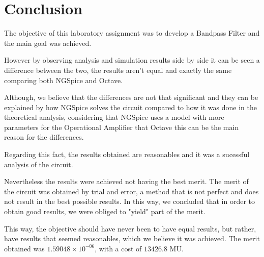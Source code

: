 \newpage
\section{Conclusion}
\label{sec:conclusion}

\hspace{0,5cm} The objective of this laboratory assignment was to develop a Bandpass Filter and the main goal was achieved. 

\par However by observing analysis and simulation results side by side it can be seen a difference between the two, the results aren't equal and exactly the same comparing both NGSpice and Octave. 
\par Although, we believe that the differences are not that significant and they can be explained by how NGSpice solves the circuit compared to how it was done in the theoretical analysis, considering that NGSpice uses a model with more parameters for the Operational Amplifier that Octave this can be the main reason for the differences. 
\par Regarding this fact, the results obtained are reasonables and it was  a sucessful analysis of the circuit.
\par Nevertheless the results were achieved not having the best merit. The merit of the circuit was obtained by trial and error, a method that is not perfect and does not result in the best possible results. In this way, we concluded that in order to obtain good results, we were obliged to "yield" part of the merit.
\par This way, the objective should have never been to have equal results, but rather, have results that seemed reasonables, which we believe it was achieved. The merit obtained was $1.59048 \times 10^{-06}$, with a cost of $13426.8$ MU.



